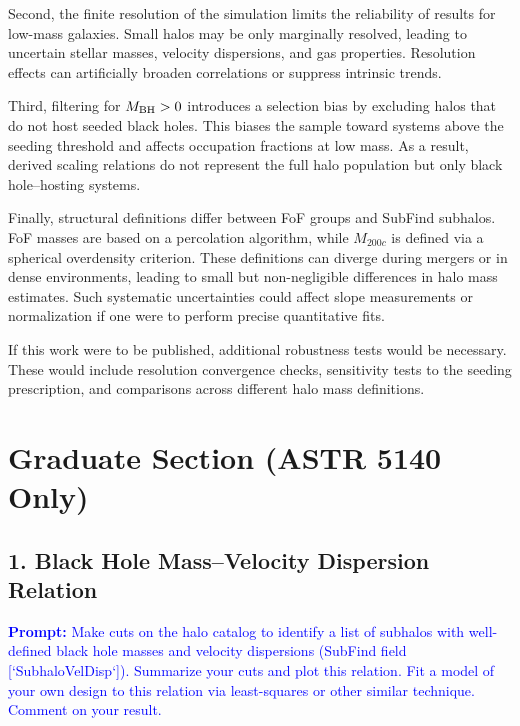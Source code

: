 \documentclass[twocolumn]{aastex631}
\begin{document}
Second, the finite resolution of the simulation limits the reliability of results for low-mass galaxies. Small halos may be only marginally resolved, leading to uncertain stellar masses, velocity dispersions, and gas properties. Resolution effects can artificially broaden correlations or suppress intrinsic trends.

Third, filtering for $M_{\rm BH} > 0$ introduces a selection bias by excluding halos that do not host seeded black holes. This biases the sample toward systems above the seeding threshold and affects occupation fractions at low mass. As a result, derived scaling relations do not represent the full halo population but only black hole–hosting systems.

Finally, structural definitions differ between FoF groups and SubFind subhalos. FoF masses are based on a percolation algorithm, while $M_{200c}$ is defined via a spherical overdensity criterion. These definitions can diverge during mergers or in dense environments, leading to small but non-negligible differences in halo mass estimates. Such systematic uncertainties could affect slope measurements or normalization if one were to perform precise quantitative fits.

If this work were to be published, additional robustness tests would be necessary. These would include resolution convergence checks, sensitivity tests to the seeding prescription, and comparisons across different halo mass definitions. 





\section{Graduate Section (ASTR 5140 Only)}


\subsection{1. Black Hole Mass--Velocity Dispersion Relation}
\textcolor{blue}{\textbf{Prompt:} Make cuts on the halo catalog to identify a list of subhalos with well-defined black hole masses and velocity dispersions (SubFind field [`SubhaloVelDisp`]). Summarize your cuts and plot this relation. Fit a model of your own design to this relation via least-squares or other similar technique. Comment on your result.}
\end{document}
